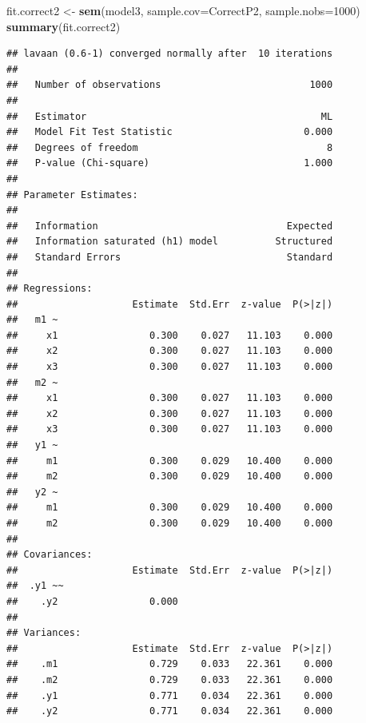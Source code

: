 \documentclass[]{article}
\newenvironment{Shaded}{\begin{snugshade}}{\end{snugshade}}
\newcommand{\KeywordTok}[1]{\textcolor[rgb]{0.13,0.29,0.53}{\textbf{#1}}}
\newcommand{\DataTypeTok}[1]{\textcolor[rgb]{0.13,0.29,0.53}{#1}}
\newcommand{\DecValTok}[1]{\textcolor[rgb]{0.00,0.00,0.81}{#1}}
\newcommand{\StringTok}[1]{\textcolor[rgb]{0.31,0.60,0.02}{#1}}
\newcommand{\NormalTok}[1]{#1}
\begin{document}
\begin{Shaded}
\begin{Highlighting}[]
\NormalTok{fit.correct2 <-}\StringTok{ }\KeywordTok{sem}\NormalTok{(model3, }\DataTypeTok{sample.cov=}\NormalTok{CorrectP2, }\DataTypeTok{sample.nobs=}\DecValTok{1000}\NormalTok{)}
\KeywordTok{summary}\NormalTok{(fit.correct2)  }
\end{Highlighting}
\end{Shaded}

\begin{verbatim}
## lavaan (0.6-1) converged normally after  10 iterations
## 
##   Number of observations                          1000
## 
##   Estimator                                         ML
##   Model Fit Test Statistic                       0.000
##   Degrees of freedom                                 8
##   P-value (Chi-square)                           1.000
## 
## Parameter Estimates:
## 
##   Information                                 Expected
##   Information saturated (h1) model          Structured
##   Standard Errors                             Standard
## 
## Regressions:
##                    Estimate  Std.Err  z-value  P(>|z|)
##   m1 ~                                                
##     x1                0.300    0.027   11.103    0.000
##     x2                0.300    0.027   11.103    0.000
##     x3                0.300    0.027   11.103    0.000
##   m2 ~                                                
##     x1                0.300    0.027   11.103    0.000
##     x2                0.300    0.027   11.103    0.000
##     x3                0.300    0.027   11.103    0.000
##   y1 ~                                                
##     m1                0.300    0.029   10.400    0.000
##     m2                0.300    0.029   10.400    0.000
##   y2 ~                                                
##     m1                0.300    0.029   10.400    0.000
##     m2                0.300    0.029   10.400    0.000
## 
## Covariances:
##                    Estimate  Std.Err  z-value  P(>|z|)
##  .y1 ~~                                               
##    .y2                0.000                           
## 
## Variances:
##                    Estimate  Std.Err  z-value  P(>|z|)
##    .m1                0.729    0.033   22.361    0.000
##    .m2                0.729    0.033   22.361    0.000
##    .y1                0.771    0.034   22.361    0.000
##    .y2                0.771    0.034   22.361    0.000
\end{verbatim}
\end{document}
